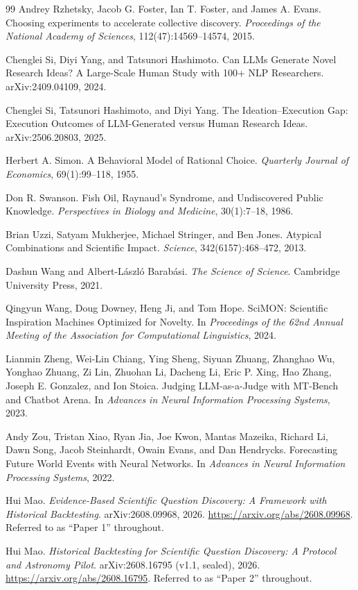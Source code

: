\documentclass[11pt]{article}
\begin{document}
\begin{thebibliography}{99}
Andrey Rzhetsky, Jacob G. Foster, Ian T. Foster, and James A. Evans.
Choosing experiments to accelerate collective discovery. \emph{Proceedings
of the National Academy of Sciences}, 112(47):14569--14574, 2015.

Chenglei Si, Diyi Yang, and Tatsunori Hashimoto. Can LLMs Generate Novel
Research Ideas? A Large-Scale Human Study with 100+ NLP Researchers.
arXiv:2409.04109, 2024.

Chenglei Si, Tatsunori Hashimoto, and Diyi Yang. The Ideation--Execution
Gap: Execution Outcomes of LLM-Generated versus Human Research Ideas.
arXiv:2506.20803, 2025.

Herbert A. Simon. A Behavioral Model of Rational Choice. \emph{Quarterly
Journal of Economics}, 69(1):99--118, 1955.

Don R. Swanson. Fish Oil, Raynaud's Syndrome, and Undiscovered Public
Knowledge. \emph{Perspectives in Biology and Medicine}, 30(1):7--18, 1986.

Brian Uzzi, Satyam Mukherjee, Michael Stringer, and Ben Jones. Atypical
Combinations and Scientific Impact. \emph{Science}, 342(6157):468--472,
2013.

Dashun Wang and Albert-L\'aszl\'o Barab\'asi. \emph{The Science of Science}.
Cambridge University Press, 2021.

Qingyun Wang, Doug Downey, Heng Ji, and Tom Hope. SciMON: Scientific
Inspiration Machines Optimized for Novelty. In \emph{Proceedings of the 62nd
Annual Meeting of the Association for Computational Linguistics}, 2024.

Lianmin Zheng, Wei-Lin Chiang, Ying Sheng, Siyuan Zhuang, Zhanghao Wu,
Yonghao Zhuang, Zi Lin, Zhuohan Li, Dacheng Li, Eric P. Xing, Hao Zhang,
Joseph E. Gonzalez, and Ion Stoica. Judging LLM-as-a-Judge with MT-Bench and
Chatbot Arena. In \emph{Advances in Neural Information Processing Systems},
2023.

Andy Zou, Tristan Xiao, Ryan Jia, Joe Kwon, Mantas Mazeika, Richard Li, Dawn
Song, Jacob Steinhardt, Owain Evans, and Dan Hendrycks. Forecasting Future
World Events with Neural Networks. In \emph{Advances in Neural Information
Processing Systems}, 2022.

Hui Mao.
\emph{Evidence-Based Scientific Question Discovery: A Framework with
Historical Backtesting}.
arXiv:2608.09968, 2026.
\url{https://arxiv.org/abs/2608.09968}.
Referred to as ``Paper 1'' throughout.

Hui Mao.
\emph{Historical Backtesting for Scientific Question Discovery: A
Protocol and Astronomy Pilot}.
arXiv:2608.16795 (v1.1, sealed), 2026.
\url{https://arxiv.org/abs/2608.16795}.
Referred to as ``Paper 2'' throughout.

\end{thebibliography}
\end{document}
